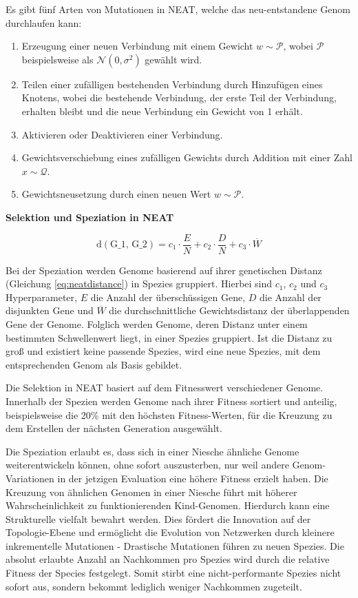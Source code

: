 Es gibt fünf Arten von Mutationen in NEAT, welche das neu-entstandene Genom durchlaufen kann:
\begin{enumerate}
	\item Erzeugung einer neuen Verbindung mit einem Gewicht $w \sim \mathcal{P}$, wobei $\mathcal{P}$ beispielsweise als $\mathcal{N}(0, \sigma^2)$ gewählt wird.
	\item Teilen einer zufälligen bestehenden Verbindung durch Hinzufügen eines Knotens, wobei die bestehende Verbindung, der erste Teil der Verbindung, erhalten bleibt und die neue Verbindung ein Gewicht von 1 erhält.
	\item Aktivieren oder Deaktivieren einer Verbindung.
	\item Gewichtsverschiebung eines zufälligen Gewichts durch Addition mit einer Zahl $x \sim \mathcal{Q}$.
	\item Gewichtsneusetzung durch einen neuen Wert $w \sim \mathcal{P}$.
\end{enumerate}

\textbf{Selektion und Speziation in NEAT}

\begin{equation}
\text{d}(\text{G_1, G_2}) = c_1 \cdot \frac{E}{N} + c_2 \cdot \frac{D}{N} + c_3 \cdot \overline{W}
\label{eq:neatdistance}
\end{equation}

Bei der Speziation werden Genome basierend auf ihrer genetischen Distanz (Gleichung \ref{eq:neatdistance}) in Spezies gruppiert. Hierbei sind $c_1$, $c_2$ und  $c_3$ Hyperparameter, $E$ die Anzahl der überschüssigen Gene, $D$ die Anzahl der disjunkten Gene und $\overline{W}$ die durchschnittliche Gewichtsdistanz der überlappenden Gene der Genome. Folglich werden Genome, deren Distanz unter einem bestimmten Schwellenwert liegt, in einer Spezies gruppiert. Ist die Distanz zu groß und existiert keine passende Spezies, wird eine neue Spezies, mit dem entsprechenden Genom als Basis gebildet. 


Die Selektion in NEAT basiert auf dem Fitnesswert verschiedener Genome. Innerhalb der Spezien werden Genome nach ihrer Fitness sortiert und anteilig, beispielsweise die 20\% mit den höchsten Fitness-Werten, für die Kreuzung zu dem Erstellen der nächsten Generation ausgewählt. 


Die Speziation erlaubt es, dass sich in einer Niesche ähnliche Genome weiterentwickeln können, ohne sofort auszusterben, nur weil andere Genom-Variationen in der jetzigen Evaluation eine höhere Fitness erzielt haben. Die Kreuzung von ähnlichen Genomen in einer Niesche führt mit höherer Wahrscheinlichkeit zu funktionierenden Kind-Genomen. Hierdurch kann eine Strukturelle vielfalt bewahrt werden. Dies fördert die Innovation auf der Topologie-Ebene und ermöglicht die Evolution von Netzwerken durch kleinere inkrementelle Mutationen - Drastische Mutationen führen zu neuen Spezies. Die absolut erlaubte Anzahl an Nachkommen pro Spezies wird durch die relative Fitness der Species festgelegt. Somit stirbt eine nicht-performante Spezies nicht sofort aus, sondern bekommt lediglich weniger Nachkommen zugeteilt.

